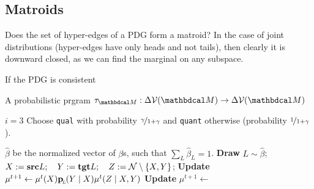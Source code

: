 \documentclass{article}
\begin{document}
	\begin{annotating}[frametitle={Matroids}]
		\subsection{Matroids}
		Does the set of hyper-edges of a PDG form a matroid?
		In the case of joint distributions (hyper-edges have only heads and not tails), then clearly it
		is downward closed, as we can find the marginal on any subspace. 
		
		
		If the PDG is consistent
	\end{annotating}
	
	
	
	A probabilistic prgram $\tau_{\dg M} : \Delta\V(\dg M) \to \Delta \V(\dg M)$
	\begin{algorithmic}
		\State $i = 3$
		    \State Choose \texttt{qual} with probability $\nicefrac{\gamma}{1+\gamma}$ and \texttt{quant} otherwise (probability $\nicefrac1{1+\gamma}$).
			
				 $\hat \beta$ be the normalized vector of $\beta$s, such that $\sum_L\hat\beta_L = 1$.
				\State \textbf{Draw}  $L \sim \hat\beta$;
				 $X:= \mathbf{src} L;\quad Y := \mathbf{tgt} L;\quad Z:= \mathcal N \setminus\{X,Y\}$;
				\State \textbf{Update} $\mu^{t+1} \gets \mu^t(X) \mathbf{p}_{\!_L\!}(Y \mid X) \mu^t(Z \mid X,Y)$
				\State \textbf{Update} $\mu^{t+1} \gets $
			\EndIf
			
		\EndFor
	\end{algorithmic}
\end{document}
